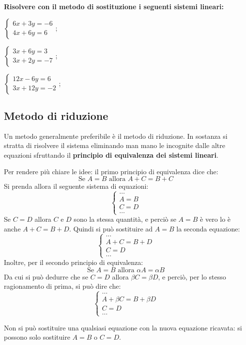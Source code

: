 \begin{exer}
    \textbf{Risolvere con il metodo di sostituzione i seguenti sistemi lineari:}

    $
        \begin{cases}
            6x + 3y = -6 \\
            4x + 6y = 6
        \end{cases}
    $;

    $
        \begin{cases}
            3x + 6y = 3 \\
            3x + 2y = -7
        \end{cases}
    $;

    $
        \begin{cases}
            12x - 6y = 6 \\
            3x + 12y = -2
        \end{cases}
    $;
\end{exer}

\subsection{Metodo di riduzione}

Un metodo generalmente preferibile è il metodo di riduzione. In sostanza si stratta di risolvere il sistema eliminando man mano le incognite dalle altre equazioni sfruttando il \textbf{principio di equivalenza dei sistemi lineari}.

Per rendere più chiare le idee: il primo principio di equivalenza dice che:
\[
    \text{Se } A = B \text{ allora } A + C = B + C
\]
Si prenda allora il seguente sistema di equazioni:
\[
    \begin{cases}
        \dots \\
        A = B \\
        C = D \\
        \dots
    \end{cases}
\]
Se $C = D$ allora $C$ e $D$ sono la stessa quantità, e perciò se $A = B$ è vero lo è anche $A + C = B + D$. Quindi si può sostituire ad $A = B$ la seconda equazione:
\[
    \begin{cases}
        \dots \\
        A + C = B + D \\
        C = D \\
        \dots
    \end{cases}
\]
Inoltre, per il secondo principio di equivalenza:
\[
    \text{Se } A = B \text{ allora } \alpha A = \alpha B
\]
Da cui si può dedurre che se $C = D$ allora $\beta C = \beta D$, e perciò, per lo stesso ragionamento di prima, si può dire che:
\[
    \begin{cases}
        \dots \\
        A + \beta C = B + \beta D \\
        C = D \\
        \dots
    \end{cases}
\]
\begin{nb}
    Non si può sostituire una qualsiasi equazione con la nuova equazione ricavata: si possono solo sostituire $A = B$ o $C = D$.
\end{nb}

